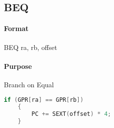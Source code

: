 \subsection{BEQ}


\paragraph{Format} BEQ ra, rb, offset

\paragraph{Purpose} Branch on Equal

\begin{lstlisting}[language=c]
    if (GPR[ra] == GPR[rb])
    {
        PC += SEXT(offset) * 4;
    }
\end{lstlisting}
